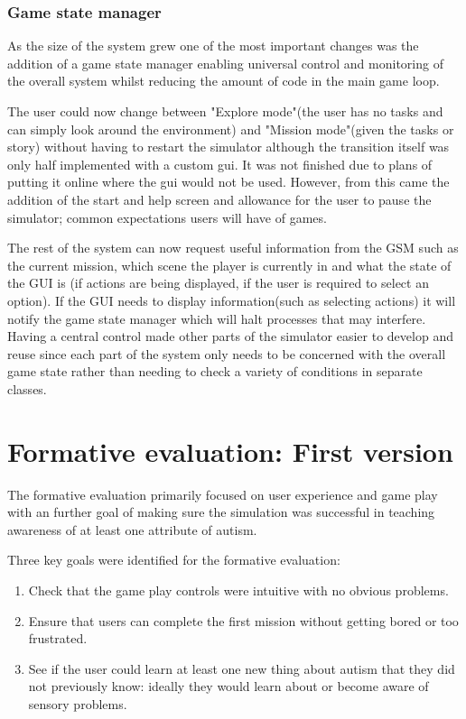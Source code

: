 \documentclass[11pt]{report}
\begin{document}
\subsection{Game state manager}

As the size of the system grew one of the most important changes was the addition of a game state manager enabling universal control and monitoring of the overall system whilst reducing the amount of code in the main game loop. 

The user could now change between "Explore mode"(the user has no tasks and can simply look around the environment) and "Mission mode"(given the tasks or story) without having to restart the simulator although the transition itself was only half implemented with a custom gui. It was not finished due to plans of putting it online where the gui would not be used. However, from this came the addition of the start and help screen and allowance for the user to pause the simulator; common expectations users will have of games.  

The rest of the system can now request useful information from the GSM such as the current mission, which scene the player is currently in and what the state of the GUI is (if actions are being displayed, if the user is required to select an option). If the GUI needs to display information(such as selecting actions) it will notify the game state manager which will halt processes that may interfere. Having a central control made other parts of the simulator easier to develop and reuse since each part of the system only needs to be concerned with the overall game state rather than needing to check a variety of conditions in separate classes.


\chapter{Formative evaluation: First version}
The formative evaluation primarily focused on user experience and game play with an further goal of making sure the simulation was successful in teaching awareness of at least one attribute of autism. 

Three key goals were identified for the formative evaluation: 
\begin{enumerate}
\item Check that the game play controls were intuitive with no obvious problems. 
\item Ensure that users can complete the first mission without getting bored or too frustrated. 
\item See if the user could learn at least one new thing about autism that they did not previously know: ideally they would learn about or become aware of sensory problems.
\end{enumerate}
\end{document}
